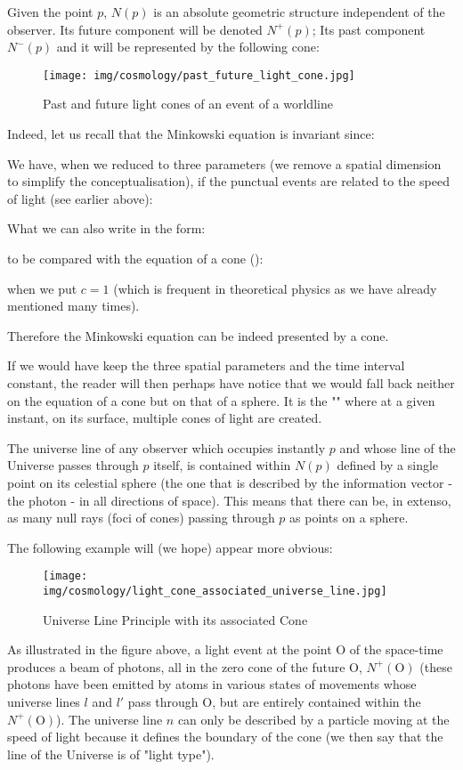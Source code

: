 	Given the point $p$, $N(p)$ is an absolute geometric structure independent of the observer. Its future component will be denoted $N^{+}(p)$; Its past component $N^{-}(p)$ and it will be represented by the following cone:
	\begin{figure}[H]
		\centering
		\texttt{[image: img/cosmology/past\_future\_light\_cone.jpg]}
		\caption{Past and future light cones of an event of a worldline}	
	\end{figure}
	Indeed, let us recall that the Minkowski equation is invariant since:
	
	We have, when we reduced to three parameters (we remove a spatial dimension to simplify the conceptualisation), if the punctual events are related to the speed of light (see earlier above):
	
	What we can also write in the form:
	
	to be compared with the equation of a cone ():
	
	when we put $c = 1$ (which is frequent in theoretical physics as we have already mentioned many times).

	Therefore the Minkowski equation can be indeed presented by a cone.
	\begin{tcolorbox}[title=Remark,colframe=black,arc=10pt]
	If we would have keep the three spatial parameters and the time interval constant, the reader will then perhaps have notice that we would fall back neither on the equation of a cone but on that of a sphere. It is the "" where at a given instant, on its surface, multiple cones of light are created.
	\end{tcolorbox}
	The universe line of any observer which occupies instantly $p$ and whose line of the Universe passes through $p$ itself, is contained within $N(p)$ defined by a single point on its celestial sphere (the one that is described by the information vector - the photon - in all directions of space). This means that there can be, in extenso, as many null rays (foci of cones) passing through $p$ as points on a sphere.

	The following example will (we hope) appear more obvious:
	\begin{figure}[H]
		\centering
		\texttt{[image: img/cosmology/light\_cone\_associated\_universe\_line.jpg]}
		\caption{Universe Line Principle with its associated Cone}	
	\end{figure}
	As illustrated in the figure above, a light event at the point O of the space-time produces a beam of photons, all in the zero cone of the future O, $N^{+}(\text{O})$ (these photons have been emitted by atoms in various states of movements whose universe lines $l$ and $l'$ pass through O, but are entirely contained within the $N^{+}(\text{O})$). The universe line $n$ can only be described by a particle moving at the speed of light because it defines the boundary of the cone (we then say that the line of the Universe is of "light type").
	
